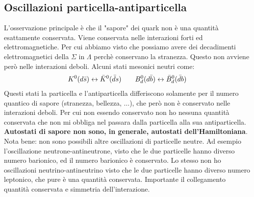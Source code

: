 \subsection{Oscillazioni particella-antiparticella}
L'osservazione principale è che il "sapore" dei quark non è una quantità esattamente conservata. Viene conservata nelle interazioni forti ed elettromagnetiche. Per cui abbiamo visto che possiamo avere dei decadimenti elettromagnetici della $\Sigma$ in $\Lambda$ perchè conservano la stranezza. Questo non avviene però nelle interazioni deboli. Alcuni stati mesonici neutri come:
\begin{equation*}
    K^0(d\Bar{s})\leftrightarrow\Bar{K}^0(\Bar{d}s) \qquad B_d^0(d\Bar{b})\leftrightarrow\Bar{B}_d^0(\Bar{d}b)
\end{equation*}
Questi stati la particella e l'antiparticella differiscono solamente per il numero quantico di sapore (stranezza, bellezza, $\ldots$), che però non è conservato nelle interazioni deboli. Per cui non essendo conservato non ho nessuna quantità conservata che non mi obbliga nel passara dalla particella alla sua antiparticella. \textbf{Autostati di sapore non sono, in generale, autostati dell'Hamiltoniana}. Nota bene: non sono possibili altre oscillazioni di particelle neutre. Ad esempio l'oscillazione neutrone-antineutrone, visto che le due particelle hanno diverso numero barionico, ed il numero barionico è conservato. Lo stesso non ho oscillazioni neutrino-antineutrino visto che le due particelle hanno diverso numero leptonico, che pure è una quantità conservata. Importante il collegamento quantità conservata e simmetria dell'interazione.
